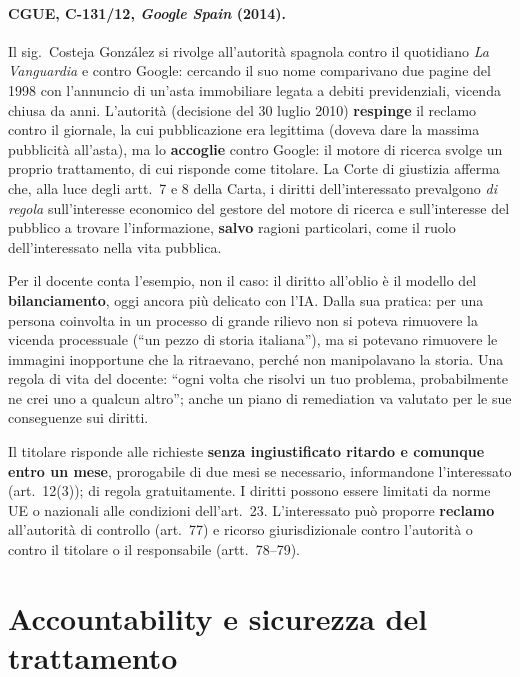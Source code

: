 \paragraph{CGUE, C-131/12, \emph{Google Spain} (2014).} Il sig.\ Costeja González si rivolge
all'autorità spagnola contro il quotidiano \emph{La Vanguardia} e contro Google: cercando il suo nome
comparivano due pagine del 1998 con l'annuncio di un'asta immobiliare legata a debiti previdenziali,
vicenda chiusa da anni. L'autorità (decisione del 30 luglio 2010) \textbf{respinge} il reclamo contro il
giornale, la cui pubblicazione era legittima (doveva dare la massima pubblicità all'asta), ma lo
\textbf{accoglie} contro Google: il motore di ricerca svolge un proprio trattamento, di cui risponde come
titolare. La Corte di giustizia afferma che, alla luce degli artt.~7 e 8 della Carta, i diritti
dell'interessato prevalgono \emph{di regola} sull'interesse economico del gestore del motore di ricerca e
sull'interesse del pubblico a trovare l'informazione, \textbf{salvo} ragioni particolari, come il ruolo
dell'interessato nella vita pubblica.

Per il docente conta l'esempio, non il caso: il diritto all'oblio è il modello del
\textbf{bilanciamento}, oggi ancora più delicato con l'IA. Dalla sua pratica: per una persona coinvolta
in un processo di grande rilievo non si poteva rimuovere la vicenda processuale (``un pezzo di storia
italiana''), ma si potevano rimuovere le immagini inopportune che la ritraevano, perché non manipolavano
la storia. Una regola di vita del docente: ``ogni volta che risolvi un tuo problema, probabilmente ne crei
uno a qualcun altro''; anche un piano di remediation va valutato per le sue conseguenze sui diritti.

\begin{integrazione}
Il titolare risponde alle richieste \textbf{senza ingiustificato ritardo e comunque entro un mese},
prorogabile di due mesi se necessario, informandone l'interessato (art.~12(3)); di regola gratuitamente.
I diritti possono essere limitati da norme UE o nazionali alle condizioni dell'art.~23. L'interessato
può proporre \textbf{reclamo} all'autorità di controllo (art.~77) e ricorso giurisdizionale contro
l'autorità o contro il titolare o il responsabile (artt.~78--79).
\end{integrazione}

\section{Accountability e sicurezza del trattamento}
\label{sec:gdpr-accountability}

